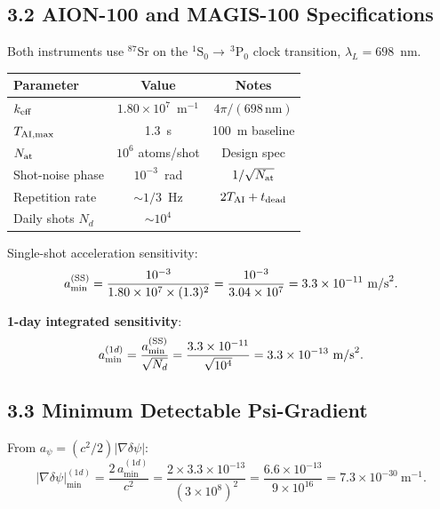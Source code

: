\documentclass[11pt,twocolumn]{article}
\newcommand{\dpsi}{\delta\psi}
\begin{document}
\subsection*{3.2 AION-100 and MAGIS-100 Specifications}

Both instruments use $^{87}$Sr on the $^1\text{S}_0 \to\,^3\text{P}_0$
clock transition, $\lambda_L = 698$~nm.

\begin{center}
\begin{tabular}{@{}lcc@{}}
\toprule
\textbf{Parameter} & \textbf{Value} & \textbf{Notes} \\
\midrule
$k_{\rm eff}$ & $1.80\times10^7$~m$^{-1}$ & $4\pi/(698\,\text{nm})$ \\
$T_{\rm AI,max}$ & 1.3~s & 100~m baseline \\
$N_{\rm at}$ & $10^6$ atoms/shot & Design spec \\
Shot-noise phase & $10^{-3}$~rad & $1/\sqrt{N_{\rm at}}$ \\
Repetition rate & $\sim1/3$~Hz & $2T_{\rm AI}+t_{\rm dead}$ \\
Daily shots $N_d$ & $\sim 10^4$ & \\
\bottomrule
\end{tabular}
\end{center}

Single-shot acceleration sensitivity:
\begin{equation}
a_{\min}^{(\rm SS)} = \frac{10^{-3}}{1.80\times10^7\times(1.3)^2}
= \frac{10^{-3}}{3.04\times10^7}
= 3.3\times10^{-11}~\text{m/s}^2.
\label{eq:a_min_SS_numerical}
\end{equation}

\textbf{1-day integrated sensitivity}:
\begin{equation}
a_{\min}^{(1d)} = \frac{a_{\min}^{(\rm SS)}}{\sqrt{N_d}}
= \frac{3.3\times10^{-11}}{\sqrt{10^4}}
= 3.3\times10^{-13}~\text{m/s}^2.
\label{eq:a_min_1day}
\end{equation}

\subsection*{3.3 Minimum Detectable Psi-Gradient}

From $a_\psi = (c^2/2)|\nabla\dpsi|$:
\begin{equation}
|\nabla\dpsi|_{\min}^{(1d)}
= \frac{2\,a_{\min}^{(1d)}}{c^2}
= \frac{2\times3.3\times10^{-13}}{(3\times10^8)^2}
= \frac{6.6\times10^{-13}}{9\times10^{16}}
= 7.3\times10^{-30}~\text{m}^{-1}.
\label{eq:dpsi_min}
\end{equation}
\end{document}
